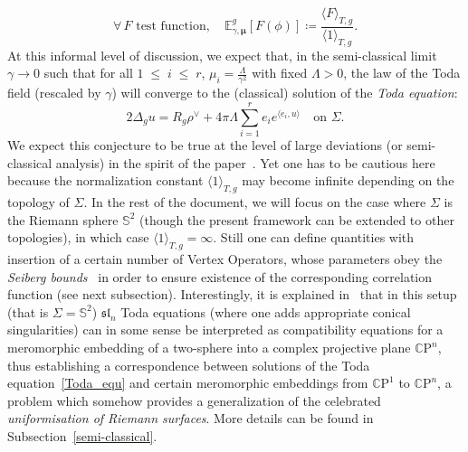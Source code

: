 \documentclass[10pt]{amsart}
\theoremstyle{definition}\newtheorem{defi}[theo]{Definition}\newtheorem{rema}[theo]{Remark}\newtheorem{exam}[theo]{Example}\newtheorem{exem}[theo]{Example}\newtheorem{nota}[theo]{Notation}
\renewcommand{\leq}{\;\leqslant\;}
\newcommand{\frksl}{\mathfrak{sl}}
\newcommand{\rmP}{\mathrm{P}}
\newcommand{\C}{\mathbb{C}}
\renewcommand*\S{\mathbb{S}}
\newcommand{\E}{\mathbb{E}}
\newcommand{\ps}[1]{\langle #1 \rangle}
\let\oldforall\forall
\renewcommand*{\forall}{\mathrel{\oldforall}}
\begin{document}
\begin{equation}\label{path_integral}
\forall \,F \text{ test function}, \quad \E^g_{\gamma,\bm \mu}[F(\phi)]\coloneqq \frac{ \langle F \rangle_{T,g}}{\langle 1 \rangle_{T,g}}.
\end{equation}
At this informal level of discussion, we expect that, in the semi-classical limit $\gamma\to0$ such that for all $1\leq i\leq r$, $\mu_i= \frac{\Lambda}{\gamma^2}$ with fixed $\Lambda>0$, the law of the Toda field (rescaled by $\gamma$) will converge to the (classical) solution of the \emph{Toda equation}:
\begin{equation}\label{Toda_equ}
2 \Delta_g u = R_g\rho^\vee + 4 \pi \Lambda\sum_{i=1}^{r} e_ie^{\ps{e_i,u}}\quad\text{on }\Sigma.
\end{equation}
We expect this conjecture to be true at the level of large deviations (or semi-classical analysis) in the spirit of the paper~\cite{LRV19}. Yet one has to be cautious here because the normalization constant $\langle 1 \rangle_{T,g}$ may become infinite depending on the topology of $\Sigma$. In the rest of the document, we will focus on the case where $\Sigma$ is the Riemann sphere $\S^2$ (though the present framework can be extended to other topologies), in which case $\langle 1 \rangle_{T,g}=\infty$. Still one can define quantities with insertion of a certain number of Vertex Operators, whose parameters obey the \emph{Seiberg bounds}~\cite{Sei90} in order to ensure existence of the corresponding correlation function (see next subsection). Interestingly, it is explained in~\cite{GeMa92} that in this setup (that is $\Sigma=\S^2$) $\frksl_n$ Toda equations (where one adds appropriate conical singularities) can in some sense be interpreted as compatibility equations for a meromorphic embedding of a two-sphere into a complex projective plane $\C\rmP^n$, thus establishing a correspondence between solutions of the Toda equation~\eqref{Toda_equ} and certain meromorphic embeddings from $\C\rmP^1$ to $\C\rmP^n$, a problem which somehow provides a generalization of the celebrated \emph{uniformisation of Riemann surfaces}. More details can be found in Subsection~\ref{semi-classical}.
\end{document}

